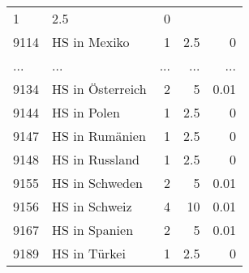 \begin{longtable}{lXrrr}
          \num{1} &
          \num[round-mode=places,round-precision=2]{2,5} &
          \num[round-mode=places,round-precision=2]{0} \\
        9114 & \multicolumn{1}{X}{HS in Mexiko} & %
          \num{1} &
          \num[round-mode=places,round-precision=2]{2,5} &
          \num[round-mode=places,round-precision=2]{0} \\
       ... & ... & ... & ... & ... \\
        9134 & \multicolumn{1}{X}{HS in Österreich} & %
          \num{2} &
          \num[round-mode=places,round-precision=2]{5} &
          \num[round-mode=places,round-precision=2]{0,01} \\

        9144 & \multicolumn{1}{X}{HS in Polen} & %
          \num{1} &
          \num[round-mode=places,round-precision=2]{2,5} &
          \num[round-mode=places,round-precision=2]{0} \\

        9147 & \multicolumn{1}{X}{HS in Rumänien} & %
          \num{1} &
          \num[round-mode=places,round-precision=2]{2,5} &
          \num[round-mode=places,round-precision=2]{0} \\

        9148 & \multicolumn{1}{X}{HS in Russland} & %
          \num{1} &
          \num[round-mode=places,round-precision=2]{2,5} &
          \num[round-mode=places,round-precision=2]{0} \\

        9155 & \multicolumn{1}{X}{HS in Schweden} & %
          \num{2} &
          \num[round-mode=places,round-precision=2]{5} &
          \num[round-mode=places,round-precision=2]{0,01} \\

        9156 & \multicolumn{1}{X}{HS in Schweiz} & %
          \num{4} &
          \num[round-mode=places,round-precision=2]{10} &
          \num[round-mode=places,round-precision=2]{0,01} \\

        9167 & \multicolumn{1}{X}{HS in Spanien} & %
          \num{2} &
          \num[round-mode=places,round-precision=2]{5} &
          \num[round-mode=places,round-precision=2]{0,01} \\

        9189 & \multicolumn{1}{X}{HS in Türkei} & %
          \num{1} &
          \num[round-mode=places,round-precision=2]{2,5} &
          \num[round-mode=places,round-precision=2]{0} \\


\end{longtable}
